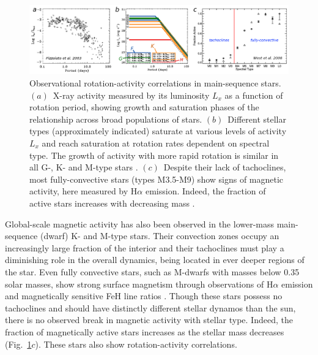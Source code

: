 \begin{figure}[!t]
  \begin{center}
    \includegraphics[width=\linewidth]{figs/chapter_1/observational_evidence_pizzolato_2003_west_2008.eps}
  \end{center}
\caption[Observational rotation-activity correlations in main-sequence stars]
	{Observational rotation-activity correlations in main-sequence stars. 
     $(a)$~X-ray activity measured by its luminosity $L_x$ 
          as a function of rotation period, showing
	  growth and saturation phases of the relationship across broad
	  populations of stars.  
     $(b)$~Different stellar types (approximately indicated) saturate
	  at various levels of activity $L_x$ and reach saturation at
	  rotation rates dependent on spectral type.  The growth of
	  activity with more rapid rotation is similar in all G-, K-
	  and M-type stars \citep[adapted from][]{Pizzolato_et_al_2003}.  
     $(c)$~Despite their lack of tachoclines, most fully-convective
  	  stars (types M3.5-M9) show signs of magnetic activity, here
	  measured by H$\alpha$ emission.  
	  Indeed, the fraction of active stars increases with
	  decreasing mass \citep[adapted from][]{West_et_al_2008}.
        \label{fig:observations of stars}}
	\vskip-0.5cm
\end{figure}

Global-scale magnetic activity has also been observed in the
lower-mass main-sequence (dwarf) K- and M-type stars.  
Their convection zones occupy an increasingly large fraction of the interior
and their tachoclines must play a diminishing role in the overall
dynamics, being located in ever deeper regions of the star.  
Even fully convective stars, such as M-dwarfs with masses below
0.35 solar masses, show strong surface magnetism through observations
of H$\alpha$ emission \citep[e.g.,][]{Hawley_et_al_1996, Mohanty&Basri_2003,
West_et_al_2004,West_et_al_2006,West_et_al_2008} and magnetically
sensitive FeH line ratios \citep{Reiners&Basri_2007,
  Reiners&Basri_2008}.  Though these stars
possess no tachoclines and should have distinctly different stellar
dynamos than the sun, there is no observed break in magnetic activity
with stellar type.  Indeed, the fraction of magnetically active stars
increases as the stellar mass decreases (Fig.~\ref{fig:observations of stars}$c$).
These stars also show rotation-activity correlations.  

